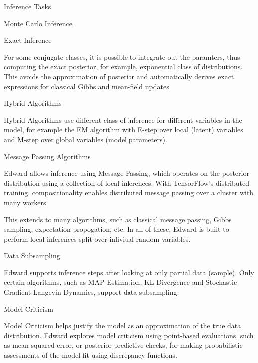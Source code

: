 \documentclass{article}
\begin{document}
\begin{question}
\begin{qsection}{Inference Tasks}
\begin{qsubsection}{Monte Carlo Inference}
		\end{qsubsection}

		\begin{qsubsection}{Exact Inference}

			For some conjugate classes, it is possible to integrate out the paramters, thus computing the exact posterior, for example, exponential class of distributions.
			This avoids the approximation of posterior and automatically derives exact expressions for classical Gibbs and mean-field updates.

		\end{qsubsection}

		\begin{qsubsection}{Hybrid Algorithms}

			Hybrid Algorithms use different class of inference for different variables in the model, for example the EM algorithm with E-step over local (latent) variables and M-step over global variables (model parameters).

		\end{qsubsection}

		\begin{qsubsection}{Message Passing Algorithms}

			Edward allows inference using Message Passing, which operates on the posterior distribution using a collection of local inferences.
			With TensorFlow's distributed training, compositionality enables distributed message passing over a cluster with many workers.

			This extends to many algorithms, such as classical message passing, Gibbs sampling, expectation propogation, etc.
			In all of these, Edward is built to perform local inferences split over infiviual random variables.

		\end{qsubsection}

	\end{qsection}

	\begin{qsection}{Data Subsampling}

		Edward supports inference steps after looking at only partial data (sample).
		Only certain algorithms, such as MAP Estimation, KL Divergence and Stochastic Gradient Langevin Dynamics, support data subsampling.

	\end{qsection}

	\begin{qsection}{Model Criticism}

		Model Criticism helps justify the model as an approximation of the true data distribution.
		Edward explores model criticism using point-based evaluations, such as mean squared error, or posterior predictive checks, for making probabilistic assessments of the model fit using discrepancy functions.

	\end{qsection}

\end{question}
\end{document}
